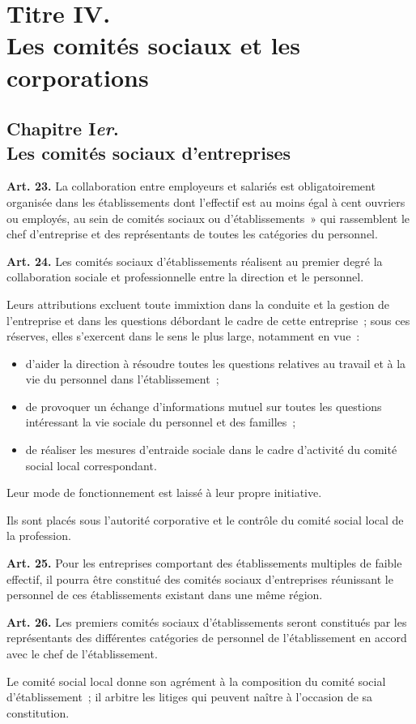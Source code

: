 \documentclass[french,twoside]{book} %
\newcommand{\labelchar}[1]{\textbf{\color{rubric} #1}}
\begin{document}
\section[Titre IV. Les comités sociaux et les corporations]{Titre IV. \\
Les comités sociaux et les corporations}
\subsection[Chapitre Ier. Les comités sociaux d’entreprises]{Chapitre I\emph{er}. \\
Les comités sociaux d’entreprises}
\noindent \labelchar{Art. 23.} La collaboration entre employeurs et salariés est obligatoirement organisée dans les établissements dont l’effectif est au moins égal à cent ouvriers ou employés, au sein de comités sociaux ou d’établissements » qui rassemblent le chef d’entreprise et des représentants de toutes les catégories du personnel.\par
\bigbreak
\noindent \labelchar{Art. 24.} Les comités sociaux d’établissements réalisent au premier degré la collaboration sociale et professionnelle entre la direction et le personnel.\par
Leurs attributions excluent toute immixtion dans la conduite et la gestion de l’entreprise et dans les questions débordant le cadre de cette entreprise ; sous ces réserves, elles s’exercent dans le sens le plus large, notamment en vue :\par

\begin{itemize}[itemsep=0pt,]
\item d’aider la direction à résoudre toutes les questions relatives au travail et à la vie du personnel dans l’établissement ;
\item de provoquer un échange d’informations mutuel sur toutes les questions intéressant la vie sociale du personnel et des familles ;
\item de réaliser les mesures d’entraide sociale dans le cadre d’activité du comité social local correspondant.
\end{itemize}
\noindent Leur mode de fonctionnement est laissé à leur propre initiative.\par
Ils sont placés sous l’autorité corporative et le contrôle du comité social local de la profession.\par
\bigbreak
\noindent \labelchar{Art. 25.} Pour les entreprises comportant des établissements multiples de faible effectif, il pourra être constitué des comités sociaux d’entreprises réunissant le personnel de ces établissements existant dans une même région.\par
\bigbreak
\noindent \labelchar{Art. 26.} Les premiers comités sociaux d’établissements seront constitués par les représentants des différentes catégories de personnel de l’établissement en accord avec le chef de l’établissement.\par
Le comité social local donne son agrément à la composition du comité social d’établissement ; il arbitre les litiges qui peuvent naître à l’occasion de sa constitution.
\end{document}
